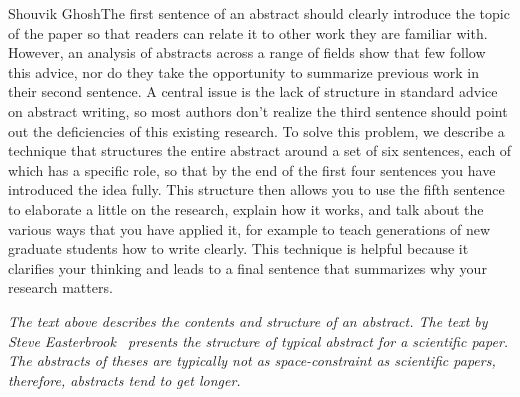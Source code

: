 Shouvik GhoshThe first sentence of an abstract should clearly introduce the topic of the paper so that readers can relate it to other work they are familiar with.
However, an analysis of abstracts across a range of fields show that few follow this advice, nor do they take the opportunity to summarize previous work in their second sentence.
A central issue is the lack of structure in standard advice on abstract writing, so most authors don’t realize the third sentence should point out the deficiencies of this existing research.
To solve this problem, we describe a technique that structures the entire abstract around a set of six sentences, each of which has a specific role, so that by the end of the first four sentences you have introduced the idea fully.
This structure then allows you to use the fifth sentence to elaborate a little on the research, explain how it works, and talk about the various ways that you have applied it, for example to teach generations of new graduate students how to write clearly.
This technique is helpful because it clarifies your thinking and leads to a final sentence that summarizes why your research matters.

\textit{The text above describes the contents and structure of an abstract.
The text by Steve Easterbrook~\cite{abstractwriting} presents the structure of typical abstract for a scientific paper.
The abstracts of theses are typically not as space-constraint as scientific papers, therefore, abstracts tend to get longer.}

